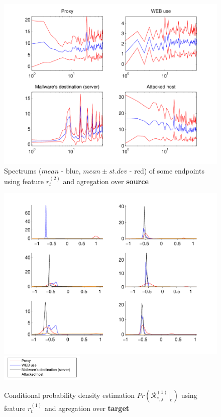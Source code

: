\documentclass[a4paper]{IEEEtran}
\begin{document}
\begin{figure}[t!]%
  \centering
  \includegraphics[width=150mm]{spect_src_logp}
  \caption{Spectrums ($mean$ - blue, $mean\pm st.dev$ - red) of some  endpoints using feature $r_t^{(2)}$ and agregation over \textbf{source}}
  \label{fig:spect_src_logp}
\end{figure}
\begin{figure}[t!]%
  \centering
  \includegraphics[width=140mm]{dens_dst_bdivp}
      \includegraphics[width=40mm]{legend}
  \caption{Conditional probability density estimation $Pr ( \mathcal{R}^{(1)}_{*,j}|_e ) $ using feature $r_t^{(1)}$ and agregation over \textbf{target}}
  \label{fig:dens_dst_bdivp}
\end{figure}
\end{document}
